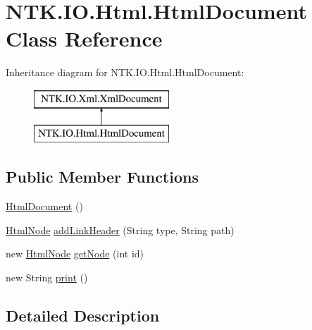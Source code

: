 \hypertarget{class_n_t_k_1_1_i_o_1_1_html_1_1_html_document}{}\section{N\+T\+K.\+I\+O.\+Html.\+Html\+Document Class Reference}
\label{class_n_t_k_1_1_i_o_1_1_html_1_1_html_document}


 


Inheritance diagram for N\+T\+K.\+I\+O.\+Html.\+Html\+Document\+:\begin{figure}[H]
\begin{center}
\leavevmode
\includegraphics[height=2.000000cm]{d3/d19/class_n_t_k_1_1_i_o_1_1_html_1_1_html_document}
\end{center}
\end{figure}
\subsection*{Public Member Functions}
\begin{DoxyCompactItemize}
\item 
\mbox{\hyperlink{class_n_t_k_1_1_i_o_1_1_html_1_1_html_document_ada35928b4653b879beaa5bb373340a0d}{Html\+Document}} ()
\item 
\mbox{\hyperlink{class_n_t_k_1_1_i_o_1_1_html_1_1_html_node}{Html\+Node}} \mbox{\hyperlink{class_n_t_k_1_1_i_o_1_1_html_1_1_html_document_afaf02ab8fd546ab1e2fca93ae9e5464a}{add\+Link\+Header}} (String type, String path)
\item 
new \mbox{\hyperlink{class_n_t_k_1_1_i_o_1_1_html_1_1_html_node}{Html\+Node}} \mbox{\hyperlink{class_n_t_k_1_1_i_o_1_1_html_1_1_html_document_a6e6151b2f9d9a21026411ecadb10b1a0}{get\+Node}} (int id)
\item 
new String \mbox{\hyperlink{class_n_t_k_1_1_i_o_1_1_html_1_1_html_document_abe7771bf8a4159856c03e46b06a0e42a}{print}} ()
\end{DoxyCompactItemize}


\subsection{Detailed Description}




